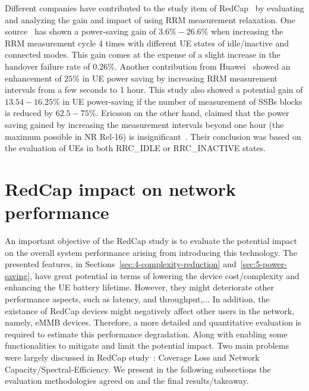 \documentclass[]{IEEEtran}
\begin{document}
Different companies have contributed to the study item of RedCap~\cite{3gpp_study_2021_38.875} by evaluating and analyzing the gain and impact of using RRM measurement relaxation. One source~\cite{3gpp_tp_2021_R2-2100459} has shown a power-saving gain of $3.6\% - 26.6\%$ when increasing the RRM measurement cycle 4 times with different UE states of idle/inactive and connected modes. This gain comes at the expense of a slight increase in the handover failure rate of $0.26\%$.
Another contribution from Huawei~\cite{3gpp_further_2020_R2-2009116} showed an enhancement of $25\%$ in UE power saving by increasing RRM measurement intervals from a few seconds to 1 hour. This study also showed a potential gain of $13.54-16.25\%$ in UE power-saving if the number of measurement of SSBs blocks is reduced by $62.5-75\%$.
Ericsson on the other hand, claimed that the power saving gained by increasing the measurement intervals beyond one hour (the maximum possible in NR Rel-16) is insignificant~\cite{3gpp_redcap_2020_R2-2009620}. Their conclusion was based on the evaluation of UEs in both RRC\_IDLE or RRC\_INACTIVE states.

%   

\section{RedCap impact on network performance}
\label{sec:6-redcap-impact}


An important objective of the RedCap study is to evaluate the potential impact on the overall system performance arising from introducing this technology.
The presented features, in Sections~\ref{sec:4-complexity-reduction} and~\ref{sec:5-power-saving}, have great potential in terms of lowering the device cost/complexity and enhancing the UE battery lifetime. 
However, they might deteriorate other performance aspects, such as latency, and throughput,... 
In addition, the existance of RedCap devices might negatively affect other users in the network, namely, eMMB devices.
Therefore, a more detailed and quantitative evaluation is required to estimate this performance degradation.
Along with enabling some functionalities to mitigate and limit the potential impact.
Two main problems were largely discussed in RedCap study~\cite{3gpp_study_2021_38.875}: Coverage Loss and Network Capacity/Spectral-Efficiency.
We present in the following subsections the evaluation methodologies agreed on and the final results/takeaway.
\end{document}
